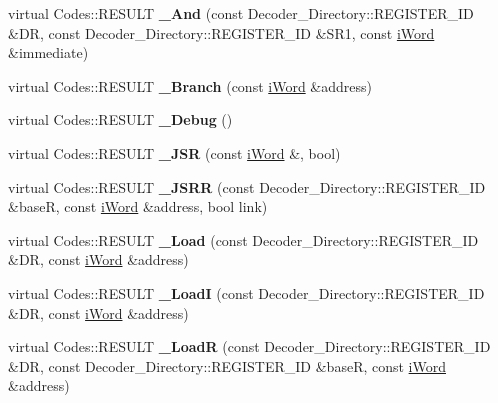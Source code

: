 \begin{DoxyCompactItemize}
\item 
\hypertarget{classWi11_aa7a7fcfe6f5ebae0a2ab31be6029002e}{
virtual Codes::RESULT {\bfseries \_\-And} (const Decoder\_\-Directory::REGISTER\_\-ID \&DR, const Decoder\_\-Directory::REGISTER\_\-ID \&SR1, const \hyperlink{classiWord}{iWord} \&immediate)}
\label{classWi11_aa7a7fcfe6f5ebae0a2ab31be6029002e}

\item 
\hypertarget{classWi11_a01960bc45e7a70a276d91ff01cd637f9}{
virtual Codes::RESULT {\bfseries \_\-Branch} (const \hyperlink{classiWord}{iWord} \&address)}
\label{classWi11_a01960bc45e7a70a276d91ff01cd637f9}

\item 
\hypertarget{classWi11_a10d6c79140c97919e2778d1c4d6f8102}{
virtual Codes::RESULT {\bfseries \_\-Debug} ()}
\label{classWi11_a10d6c79140c97919e2778d1c4d6f8102}

\item 
\hypertarget{classWi11_a52b3325579e31ff96b4b441e682f7a9d}{
virtual Codes::RESULT {\bfseries \_\-JSR} (const \hyperlink{classiWord}{iWord} \&, bool)}
\label{classWi11_a52b3325579e31ff96b4b441e682f7a9d}

\item 
\hypertarget{classWi11_ac9b81d78bd364390dbe12bb29c3f0967}{
virtual Codes::RESULT {\bfseries \_\-JSRR} (const Decoder\_\-Directory::REGISTER\_\-ID \&baseR, const \hyperlink{classiWord}{iWord} \&address, bool link)}
\label{classWi11_ac9b81d78bd364390dbe12bb29c3f0967}

\item 
\hypertarget{classWi11_a0538e8d3ca35e6ca84646ae4b81ad5bd}{
virtual Codes::RESULT {\bfseries \_\-Load} (const Decoder\_\-Directory::REGISTER\_\-ID \&DR, const \hyperlink{classiWord}{iWord} \&address)}
\label{classWi11_a0538e8d3ca35e6ca84646ae4b81ad5bd}

\item 
\hypertarget{classWi11_a1eabd2329888b4ac7785fe67a066f814}{
virtual Codes::RESULT {\bfseries \_\-LoadI} (const Decoder\_\-Directory::REGISTER\_\-ID \&DR, const \hyperlink{classiWord}{iWord} \&address)}
\label{classWi11_a1eabd2329888b4ac7785fe67a066f814}

\item 
\hypertarget{classWi11_aff3d7b77430caa90933276c664c303fc}{
virtual Codes::RESULT {\bfseries \_\-LoadR} (const Decoder\_\-Directory::REGISTER\_\-ID \&DR, const Decoder\_\-Directory::REGISTER\_\-ID \&baseR, const \hyperlink{classiWord}{iWord} \&address)}
\label{classWi11_aff3d7b77430caa90933276c664c303fc}


\end{DoxyCompactItemize}
